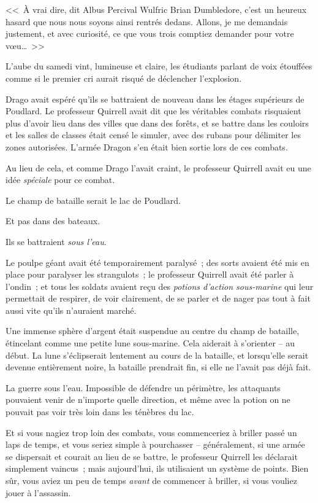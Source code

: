 <<~À vrai dire, dit Albus Percival Wulfric Brian Dumbledore, c'est un heureux hasard que nous nous soyons ainsi rentrés dedans. Allons, je me demandais justement, et avec curiosité, ce que vous trois comptiez demander pour votre vœu…~>>

\later

L'aube du samedi vint, lumineuse et claire, les étudiants parlant de voix étouffées comme si le premier cri aurait risqué de déclencher l'explosion.

\later

Drago avait espéré qu'ils se battraient de nouveau dans les étages supérieurs de Poudlard. Le professeur Quirrell avait dit que les véritables combats risquaient plus d'avoir lieu dans des villes que dans des forêts, et se battre dans les couloirs et les salles de classes était censé le simuler, avec des rubans pour délimiter les zones autorisées. L'armée Dragon s'en était bien sortie lors de ces combats.

Au lieu de cela, et comme Drago l'avait craint, le professeur Quirrell avait eu une idée \emph{spéciale} pour ce combat.

Le champ de bataille serait le lac de Poudlard.

Et pas dans des bateaux.

Ils se battraient \emph{sous l'eau}.

Le poulpe géant avait été temporairement paralysé~; des sorts avaient été mis en place pour paralyser les strangulots~; le professeur Quirrell avait été parler à l'ondin~; et tous les soldats avaient reçu des \emph{potions d'action sous-marine} qui leur permettait de respirer, de voir clairement, de se parler et de nager pas tout à fait aussi vite qu'ils n'auraient marché.

Une immense sphère d'argent était suspendue au centre du champ de bataille, étincelant comme une petite lune sous-marine. Cela aiderait à s'orienter -- au début. La lune s'éclipserait lentement au cours de la bataille, et lorsqu'elle serait devenue entièrement noire, la bataille prendrait fin, si elle ne l'avait pas déjà fait.

La guerre sous l'eau. Impossible de défendre un périmètre, les attaquants pouvaient venir de n'importe quelle direction, et même avec la potion on ne pouvait pas voir très loin dans les ténèbres du lac.

Et si vous nagiez trop loin des combats, vous commenceriez à briller passé un laps de temps, et vous seriez simple à pourchasser -- généralement, si une armée se dispersait et courait au lieu de se battre, le professeur Quirrell les déclarait simplement vaincus~; mais aujourd'hui, ils utilisaient un système de points. Bien sûr, vous aviez un peu de temps \emph{avant} de commencer à briller, si vous vouliez jouer à l'assassin.

